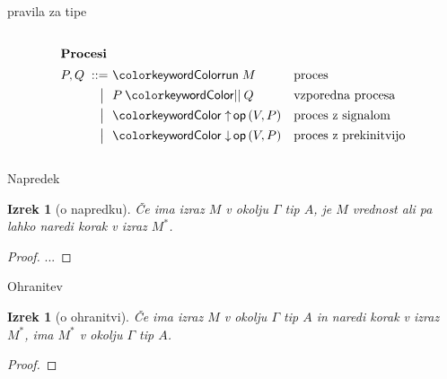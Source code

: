 \documentclass{beamer}
\theoremstyle{definition} %
\theoremstyle{plain} %
\newtheorem{izrek}[definicija]{Izrek}
\begin{document}
\begin{frame}{pravila za tipe}
\begin{columns}[T]
			\begin{column}{0.42\textwidth}
				\begin{figure}[hp]
					\parbox{\textwidth}{
						\centering
						\tiny
						\begin{align*}
						\intertext{\textbf{Procesi}}
						P, Q
						\bnfis & \tmrun M & & \text{proces} \\
						\bnfor & \tmpar P Q & & \text{vzporedna procesa} \\
						\bnfor & \tmopout{op}{V}{P} & & \text{proces z signalom} \\
						\bnfor & \tmopin{op}{V}{P}  & & \text{proces z prekinitvijo}
						\end{align*}
					} 
				\end{figure}
			\end{column}
		\end{columns}	
	\end{frame}

	
	\begin{frame}{Napredek}
		
		\begin{izrek}[o napredku]
			Če ima izraz $M$ v okolju $\Gamma$ tip $A$, je $M$ vrednost ali pa lahko naredi korak v izraz $M^*$.
		\end{izrek}
		
		\begin{proof}
			... 
		\end{proof}
		
	\end{frame}

	
		
	\begin{frame}{Ohranitev}
				
		\begin{izrek}[o ohranitvi]
			Če ima izraz $M$ v okolju $\Gamma$ tip $A$ in naredi korak v izraz $M^*$, ima $M^*$ v okolju $\Gamma$ tip $A$.
		\end{izrek}
		
		\begin{proof}
		\end{proof}
		
	\end{frame}
\end{document}
